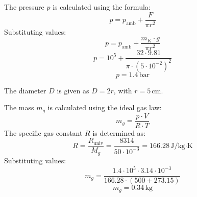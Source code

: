 The pressure \( p \) is calculated using the formula:  
\[
p = p_{\text{amb}} + \frac{F}{\pi r^2}
\]  
Substituting values:  
\[
p = p_{\text{amb}} + \frac{m_K \cdot g}{\pi r^2}
\]  
\[
p = 10^5 + \frac{32 \cdot 9.81}{\pi \cdot (5 \cdot 10^{-2})^2}
\]  
\[
p = 1.4 \, \text{bar}
\]  

The diameter \( D \) is given as \( D = 2r \), with \( r = 5 \, \text{cm} \).  

The mass \( m_g \) is calculated using the ideal gas law:  
\[
m_g = \frac{p \cdot V}{R \cdot T}
\]  
The specific gas constant \( R \) is determined as:  
\[
R = \frac{R_{\text{univ}}}{M_g} = \frac{8314}{50 \cdot 10^{-3}} = 166.28 \, \text{J/kg·K}
\]  
Substituting values:  
\[
m_g = \frac{1.4 \cdot 10^5 \cdot 3.14 \cdot 10^{-3}}{166.28 \cdot (500 + 273.15)}
\]  
\[
m_g = 0.34 \, \text{kg}
\]